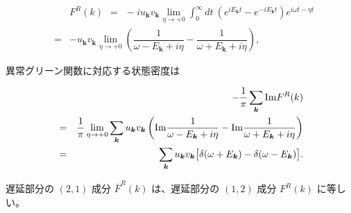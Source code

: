 \documentclass[uplatex,a4j,12pt,dvipdfmx]{jsarticle}
\begin{document}
\begin{eqnarray}
	&&
	F^{R}(k)
	\ \ = \ \
	- i
	u_{\bm{k}}
	v_{\bm{k}}
	\lim_{\eta \to +0}
	\int^{\infty}_{0} \!\! dt \
	\left(
	e^{ i E_{\bm{k}} t }
	-
	e^{ - i E_{\bm{k}} t }
	\right)
	e^{i \omega t - \eta t}
	\nonumber \\ &=&
	-
	u_{\bm{k}} v_{\bm{k}}
	\lim_{\eta \to +0}
	\left(
	\dfrac{1}{\omega - E_{\bm{k}} + i \eta }
	-
	\dfrac{1}{\omega + E_{\bm{k}} + i \eta }
	\right)
	,
\end{eqnarray}

異常グリーン関数に対応する状態密度は

\begin{eqnarray}
	&&
	-
	\dfrac{ 1 }{ \pi }
	\sum_{\bm{k}}
	{\rm Im} F^{R}(k)
	\nonumber \\ &=&
	\dfrac{ 1 }{ \pi }
	\lim_{\eta \to +0}
	\sum_{\bm{k}}
	u_{\bm{k}} v_{\bm{k}}
	\left(
	{\rm Im}
	\dfrac{1}{\omega - E_{\bm{k}} + i \eta }
	-
	{\rm Im}
	\dfrac{1}{\omega + E_{\bm{k}} + i \eta }
	\right)
	\nonumber \\ &=&
	\sum_{\bm{k}}
	u_{\bm{k}} v_{\bm{k}}
	\big[
		\delta( \omega + E_{\bm{k}} )
		-
		\delta( \omega - E_{\bm{k}} )
		\big]
	.
	\nonumber \\
\end{eqnarray}


遅延部分の $(2,1)$ 成分 $\bar{F}^{R}(k)$ は、遅延部分の $(1,2)$ 成分 $F^{R}(k)$ に等しい。
\end{document}
